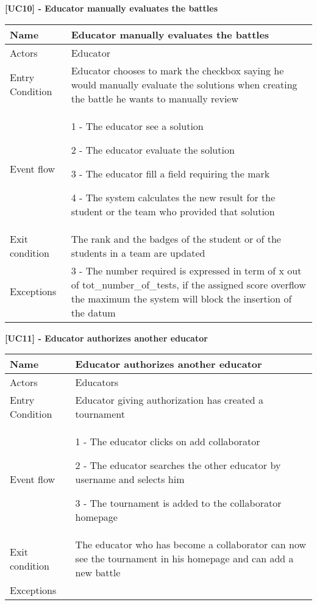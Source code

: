       \begin{table}[h]
    \textbf{[UC10] - Educator manually evaluates the battles }

    
      \centering
      \begin{tabular}{|p{3cm}|p{14cm}|}
        \hline
        Name & Educator manually evaluates the battles \\
        \hline
        Actors & Educator \\
        \hline
        Entry Condition &  Educator chooses to mark the checkbox saying he would manually evaluate the solutions when creating the battle he wants to manually review \\
        \hline
        Event flow &  1 - The educator see a solution
        
        2 - The educator evaluate the solution

        3 - The educator fill a field requiring the mark

        4 - The system calculates the new result for the student or the team who provided that solution
        \\

        \hline
        Exit condition &  The rank and the badges of the student or of the students in a team are updated \\
        \hline
        Exceptions & 3 - The number required is expressed in term of x out of tot\_number\_of\_tests, if the assigned score overflow the maximum the system will block the insertion of the datum
        \\
        \hline
      \end{tabular}
      
    \end{table}

    \begin{table}[]
    \textbf{[UC11] - Educator authorizes another educator}
    
      \centering
      \begin{tabular}{|p{3cm}|p{14cm}|}
        \hline
         Name & Educator authorizes another educator \\
        \hline
        Actors & Educators \\
        \hline
        Entry Condition & Educator giving authorization has created a tournament \\
        \hline
        Event flow &  1 - The educator clicks on add collaborator
        
        2 - The educator searches the other educator by username and selects him

        3 - The tournament is added to the collaborator homepage
        \\
        \hline
        Exit condition & The educator who has become a collaborator can now see the tournament in his homepage and can add a new battle  \\
        \hline
        Exceptions & 
        \\
        \hline
      \end{tabular}
      
    \end{table}

